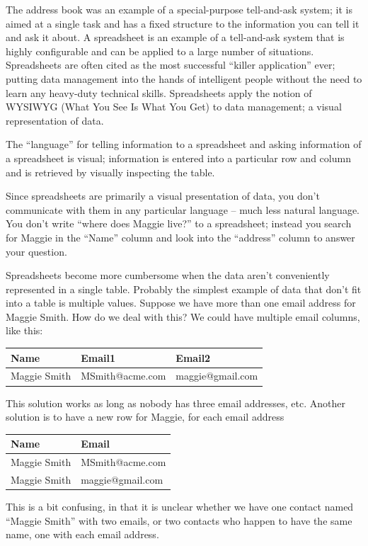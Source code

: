 The address book was an example of a special-purpose tell-and-ask
system; it is aimed at a single task and has a fixed structure to the
information you can tell it and ask it about. A spreadsheet is an
example of a tell-and-ask system that is highly configurable and can be
applied to a large number of situations. Spreadsheets are often cited as
the most successful ``killer application'' ever; putting data management
into the hands of intelligent people without the need to learn any
heavy-duty technical skills. Spreadsheets apply the notion of WYSIWYG
(What You See Is What You Get) to data management; a visual
representation of data.

The ``language'' for telling information to a spreadsheet and asking
information of a spreadsheet is visual; information is entered into a
particular row and column and is retrieved by visually inspecting the
table.

Since spreadsheets are primarily a visual presentation of data, you
don't communicate with them in any particular language -- much less
natural language. You don't write ``where does Maggie live?'' to a
spreadsheet; instead you search for Maggie in the ``Name'' column and
look into the ``address'' column to answer your question.

Spreadsheets become more cumbersome when the data aren't conveniently
represented in a single table. Probably the simplest example of data
that don't fit into a table is multiple values. Suppose we have more
than one email address for Maggie Smith. How do we deal with this? We
could have multiple email columns, like this:

\begin{tabular}{|l l l|}
\hline
Name&Email1&Email2\\
\hline
Maggie Smith&MSmith@acme.com&maggie@gmail.com \\
\hline
\end{tabular}

This solution works as long as nobody has three email addresses, etc.
Another solution is to have a new row for Maggie, for each email address

\begin{tabular}{|l l|}
\hline
Name&Email \\
\hline
Maggie Smith&MSmith@acme.com\\
Maggie Smith&maggie@gmail.com\\
\hline
\end{tabular}

This is a bit confusing, in that it is unclear whether we have one
contact named ``Maggie Smith'' with two emails, or two contacts who
happen to have the same name, one with each email address.


